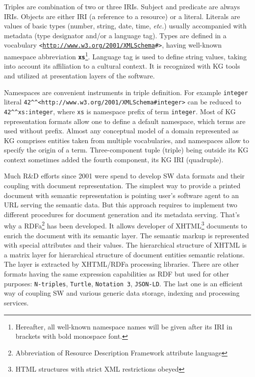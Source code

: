 \documentclass[
]{ceurart}
\newcommand{\ns}[1]{\textbf{\texttt{#1}}}
\begin{document}
Triples are combination of two or three IRIs.  Subject and predicate are always IRIs.  Objects are either IRI (a reference to a resource) or a literal.  Literals are values of basic types (number, string, date, time, \emph{etc.}) usually accompanied with metadata (type designator and/or a language tag).  Types are defined in a vocabulary \texttt{<\url{http://www.w3.org/2001/XMLSchema}\#>}, having well-known namespace abbreviation \ns{xs}\footnote{Hereafter, all well-known namespace names will be given after its IRI in brackets with bold monospace font.}.  Language tag is used to define string values, taking into account its affiliation to a cultural context.  It is recognized with KG tools and utilized at presentation layers of the software.

Namespaces are convenient instruments in triple definition.  For example \verb|integer| literal \verb|42^^<http://www.w3.org/2001/XMLSchema#integer>| can be reduced to \verb|42^^xs:integer|, where \verb|xs| is namespace prefix of term \verb|integer|.  Most of KG representation formats allow one to define a default namespace, which terms are used without prefix.  Almost any conceptual model of a domain represented as KG comprises entities taken from multiple vocabularies, and namespaces allow to specify the origin of a term.  Three-component tuple (triple) being outside its KG context sometimes added the fourth component, its KG IRI (quadruple).

Much R\&D efforts since 2001 \cite{tbl} were spend to develop SW data formats and their coupling with document representation.  The simplest way to provide a printed document with semantic representation is pointing user's software agent to an URL serving the semantic data.  But this approach requires to implement two different procedures for document generation and its metadata serving.  That's why a RDFa\footnote{Abbreviation of Resource Description Framework attribute language} has been developed.  It allows developer of XHTML\footnote{HTML structures with strict XML restrictions obeyed} documents to enrich the document with its semantic layer.  The semantic markup is represented with special attributes and their values.  The hierarchical structure of XHTML is a matrix layer for hierarchical structure of document entities semantic relations.  The layer is extracted by XHTML/RDFa processing libraries.  There are other formats having the same expression capabilities as RDF but used for other purposes: \texttt{N-triples}, \texttt{Turtle}, \texttt{Notation~3}, \texttt{JSON-LD}.  The last one is an efficient way of coupling SW and various generic data storage, indexing and processing services.
\end{document}
